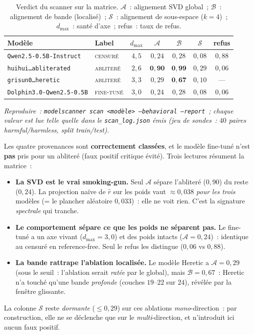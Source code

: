 \documentclass[11pt,a4paper]{article}
\theoremstyle{definition}
\theoremstyle{plain}
\newcommand{\rhat}{\hat{r}}
\begin{document}
\begin{table}[H]
\centering
\caption{Verdict du scanner sur la matrice. $\mathcal{A}$~: alignement SVD global~;
$\mathcal{B}$~: alignement de bande (localisé)~; $\mathcal{S}$~: alignement de
sous-espace ($k{=}4$)~; $d_{\max}$~: santé d'axe~; \og refus\fg{}~: taux de refus.}
\label{tab:matrice}
\begin{tabular}{llccccc}
\toprule
Modèle & Label & $d_{\max}$ & $\mathcal{A}$ & $\mathcal{B}$ & $\mathcal{S}$ & refus \\
\midrule
\texttt{Qwen2.5-0.5B-Instruct} & \textsc{censuré} & $4{,}5$ & $0{,}24$ & $0{,}28$ & $0{,}08$ & $0{,}88$ \\
\texttt{huihui\dots abliterated} & \textsc{abliteré} & $2{,}6$ & $\mathbf{0{,}90}$ & $\mathbf{0{,}99}$ & $0{,}29$ & $0{,}06$ \\
\texttt{grisun0\dots heretic} & \textsc{abliteré} & $3{,}3$ & $0{,}29$ & $\mathbf{0{,}67}$ & $0{,}10$ & --- \\
\texttt{Dolphin3.0-Qwen2.5-0.5B} & \textsc{fine-tuné} & $3{,}0$ & $0{,}24$ & $0{,}28$ & $0{,}08$ & $0{,}06$ \\
\bottomrule
\end{tabular}
\end{table}

\noindent\emph{\small Reproduire~: \texttt{modelscanner scan <modèle> --behavioral
--report}~; chaque valeur est lue telle quelle dans le \texttt{scan\_log.json} émis
(jeu de sondes~: $40$ paires harmful/harmless, split train/test).}

\noindent Les quatre provenances sont \textbf{correctement classées}, et le modèle
fine-tuné n'est \textbf{pas} pris pour un abliteré (faux positif critique évité).
Trois lectures résument la matrice~:
\begin{itemize}\itemsep2pt
  \item \textbf{La SVD est le vrai smoking-gun.} Seul $\mathcal{A}$ sépare l'abliteré
  ($0{,}90$) du reste ($0{,}24$). La projection naïve de $\rhat$ sur les poids vaut
  $\approx 0{,}038$ \emph{pour les trois} modèles (= le plancher aléatoire $0{,}033$)~:
  elle ne voit rien. C'est la signature \emph{spectrale} qui tranche.
  \item \textbf{Le comportement sépare ce que les poids ne séparent pas.} Le fine-tuné
  a un axe vivant ($d_{\max}=3{,}0$) et des poids intacts ($\mathcal{A}=0{,}24$)~:
  identique au censuré en reference-free. Seul le refus les distingue ($0{,}06$ vs
  $0{,}88$).
  \item \textbf{La bande rattrape l'ablation localisée.} Le modèle Heretic a
  $\mathcal{A}=0{,}29$ (sous le seuil~: l'ablation serait \emph{ratée} par le global),
  mais $\mathcal{B}=0{,}67$~: Heretic n'a touché qu'une bande \emph{profonde}
  (couches $19$--$22$ sur $24$), révélée par la fenêtre glissante.
\end{itemize}
La colonne $\mathcal{S}$ reste \emph{dormante} ($\le 0{,}29$) sur ces ablations
\emph{mono}-direction~: par construction, elle ne se déclenche que sur le
\emph{multi}-direction, et n'introduit ici aucun faux positif.
\end{document}
